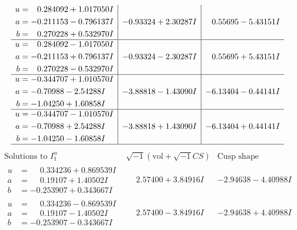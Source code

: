 \documentclass[1p]{elsarticle_modified}
\theoremstyle{definition}
\newcommand{\I}{\sqrt{-1}}
\begin{document}
$$\begin{array}{c|c|c}
\begin{aligned}
u &= \phantom{-}0.284092 + 1.017050 I \\
a &= -0.211153 - 0.796137 I \\
b &= \phantom{-}0.270228 + 0.532970 I\end{aligned}
 & -0.93324 + 2.30287 I & \phantom{-}0.55695 - 5.43151 I \\ \hline\begin{aligned}
u &= \phantom{-}0.284092 - 1.017050 I \\
a &= -0.211153 + 0.796137 I \\
b &= \phantom{-}0.270228 - 0.532970 I\end{aligned}
 & -0.93324 - 2.30287 I & \phantom{-}0.55695 + 5.43151 I \\ \hline\begin{aligned}
u &= -0.344707 + 1.010570 I \\
a &= -0.70988 - 2.54288 I \\
b &= -1.04250 + 1.60858 I\end{aligned}
 & -3.88818 - 1.43090 I & -6.13404 - 0.44141 I \\ \hline\begin{aligned}
u &= -0.344707 - 1.010570 I \\
a &= -0.70988 + 2.54288 I \\
b &= -1.04250 - 1.60858 I\end{aligned}
 & -3.88818 + 1.43090 I & -6.13404 + 0.44141 I\\
 \hline 
 \end{array}$$\newpage$$\begin{array}{c|c|c}  
\text{Solutions to }I^u_{1}& \I (\text{vol} + \sqrt{-1}CS) & \text{Cusp shape}\\
 \hline 
\begin{aligned}
u &= \phantom{-}0.334236 + 0.869539 I \\
a &= \phantom{-}0.19107 + 1.40502 I \\
b &= -0.253907 + 0.343667 I\end{aligned}
 & \phantom{-}2.57400 + 3.84916 I & -2.94638 - 4.40988 I \\ \hline\begin{aligned}
u &= \phantom{-}0.334236 - 0.869539 I \\
a &= \phantom{-}0.19107 - 1.40502 I \\
b &= -0.253907 - 0.343667 I\end{aligned}
 & \phantom{-}2.57400 - 3.84916 I & -2.94638 + 4.40988 I \\ \hline\begin{aligned}

\end{aligned}
\end{array}$$
\end{document}
